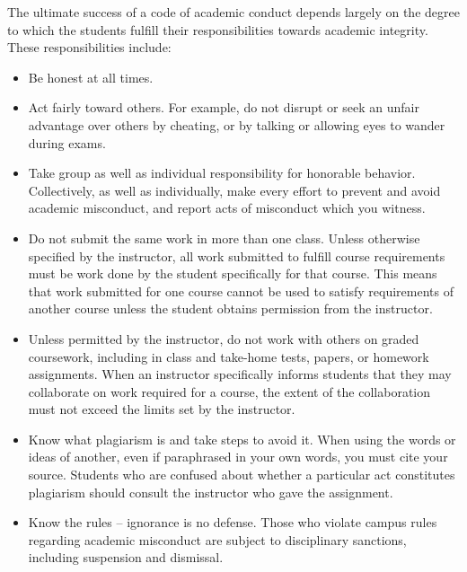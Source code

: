 \documentclass{article}
\begin{document}
The ultimate success of a code of academic conduct depends largely on
the degree to which the students fulfill their responsibilities
towards academic integrity.  These responsibilities include:
\begin{itemize}

\item Be honest at all times.

\item Act fairly toward others. For example, do not disrupt or seek an
  unfair advantage over others by cheating, or by talking or allowing
  eyes to wander during exams.

\item Take group as well as individual responsibility for honorable
  behavior.  Collectively, as well as individually, make every effort
  to prevent and avoid academic misconduct, and report acts of
  misconduct which you witness.

\item Do not submit the same work in more than one class. Unless
  otherwise specified by the instructor, all work submitted to fulfill
  course requirements must be work done by the student specifically
  for that course.  This means that work submitted for one course
  cannot be used to satisfy requirements of another course unless the
  student obtains permission from the instructor.

\item Unless permitted by the instructor, do not work with others on
  graded coursework, including in class and take-home tests, papers,
  or homework assignments. When an instructor specifically informs
  students that they may collaborate on work required for a course,
  the extent of the collaboration must not exceed the limits set by
  the instructor.

\item Know what plagiarism is and take steps to avoid it. When using
  the words or ideas of another, even if paraphrased in your own
  words, you must cite your source. Students who are confused about
  whether a particular act constitutes plagiarism should consult the
  instructor who gave the assignment.

\item Know the rules -- ignorance is no defense. Those who violate
  campus rules regarding academic misconduct are subject to
  disciplinary sanctions, including suspension and dismissal.

\end{itemize}
\end{document}
